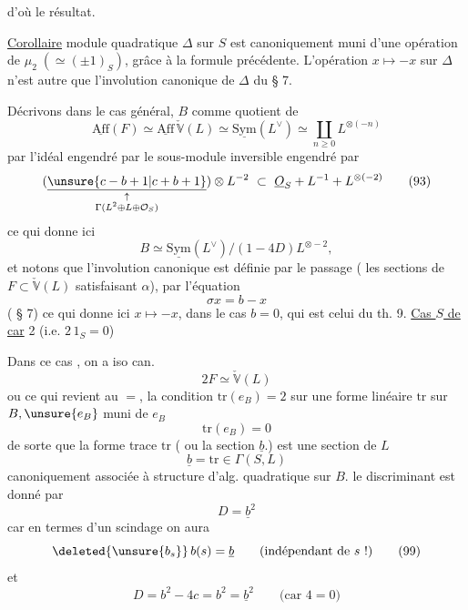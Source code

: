  d'où le résultat.

\uline{Corollaire}   module quadratique $\Delta$ sur $S$ est canoniquement muni d'une opération de $\mu_2\;(\simeq(\pm1)_S)$, grâce à la formule précédente. L'opération $x\mapsto-x$  sur $\Delta$ n'est autre que l'involution canonique de $\Delta$ du § 7.

Décrivons   dans le cas général, $B$ comme quotient de
\[
\underline{\mathrm{Aff}}(F)\simeq\underline{\mathrm{Aff}}\,\check{\mathbb V}(L)\simeq\underline{\mathrm{Sym}}(L^\vee)\simeq\coprod_{n\geq0} L^{\otimes(-n)}
\]
par l'idéal engendré par le sous-module inversible engendré par
\[
(\underset{\substack{\uparrow\\\Gamma(L^2\oplus L\oplus\mathcal O_S)}}{\underline{\unsure{c-b+1|c+b+1}}})\otimes L^{-2}\ \subset\ \underline O_S+L^{-1}+L^{\otimes(-2)}\tag*{$(93)$}
\]
 ce qui donne ici
\[
B\simeq\underline{\mathrm{Sym}}(L^\vee)/(1-4D)L^{\otimes-2},
\]
et notons que l'involution canonique est définie par le passage ( les sections de $F\subset\check{\mathbb V}(L)$ satisfaisant $\alpha$), par l'équation
\[
\sigma x=b-x\tag*{$(94)$}
\]
( § 7) ce qui donne ici $x\mapsto-x$, dans le cas $b=0$, qui est celui du th.
9. \uline{Cas $S$ de car} 2 (i.e. $2\,1_S=0$)

Dans ce cas , on a iso can.
\[2F\simeq\check{\mathbb V}(L)\tag*{(95)}\]
ou ce qui revient au $=$, la condition $\mathrm{tr}(e_B)=2$ sur une forme linéaire $\mathrm{tr}$ sur $B,\unsure{e_B}$ muni de $e_B$  
\[\mathrm{tr}(e_B)=0\tag*{(96)}\]
de sorte que la forme trace $\mathrm{tr}$ ( ou la section $\underline b$.) est une section de $L$
\[\underline b=\mathrm{tr}\in\Gamma(S,L)\tag*{(97)}\]
canoniquement associée à  structure d'alg. quadratique sur $B$.   le discriminant est donné par
\[D=\underline b^2\tag*{(98)}\]
car en termes d'un scindage  on aura 
\[\deleted{\unsure{b_s}}\,b(s)=\underline b\qquad\text{(indépendant de $s$ !)}\tag*{(99)}\]
et
\[D=b^2-4c=b^2=\underline b^2\qquad\text{(car $4=0$)}\]

